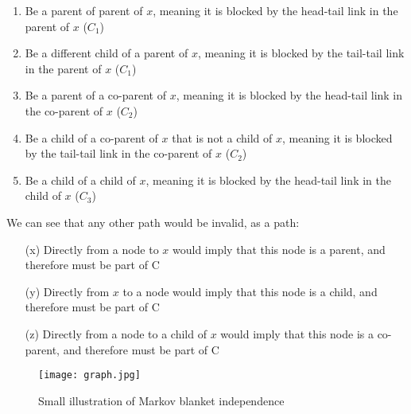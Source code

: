 \documentclass[11pt]{article} %
\begin{document}
\begin{enumerate}
\begin{enumerate}
	\item Be a parent of parent of $x$, meaning it is blocked by the head-tail link in the parent of $x$ ($C_1$)
	\item Be a different child of a parent of $x$, meaning it is blocked by the tail-tail link in the parent of $x$ ($C_1$)
	\item Be a parent of a co-parent of $x$, meaning it is blocked by the head-tail link in the co-parent of $x$ ($C_2$)
	\item Be a child of a co-parent of $x$ that is not a child of $x$, meaning it is blocked by the tail-tail link in the co-parent of $x$ ($C_2$)
	\item Be a child of a child of $x$, meaning it is blocked by the head-tail link in the child of $x$ ($C_3$)
\end{enumerate}
We can see that any other path would be invalid, as a path: \begin{enumerate}
	\item[(x)] Directly from a node to $x$ would imply that this node is a parent, and therefore must be part of C
	\item[(y)] Directly from $x$ to a node would imply that this node is a child, and therefore must be part of C
	\item[(z)] Directly from a node to a child of $x$ would imply that this node is a co-parent, and therefore must be part of C
\end{enumerate}
\begin{figure}[h!]
  \center
  \texttt{[image: graph.jpg]}
  \caption{Small illustration of Markov blanket independence}
  \label{markov}
\end{figure}


\end{enumerate}
\end{document}
